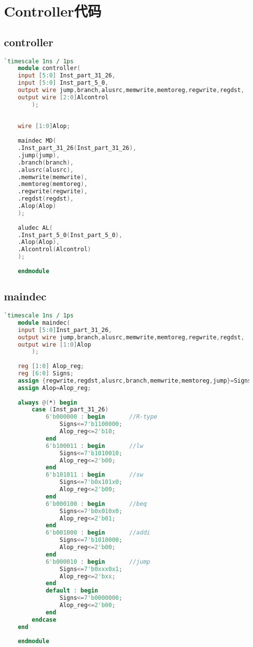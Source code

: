 \appendix
\section{Controller代码}
\subsection{controller}
\begin{lstlisting}[language=Verilog]
    `timescale 1ns / 1ps
    module controller(
    input [5:0] Inst_part_31_26,
    input [5:0] Inst_part_5_0,
    output wire jump,branch,alusrc,memwrite,memtoreg,regwrite,regdst,
    output wire [2:0]Alcontrol
        );
    
    
    wire [1:0]Alop;
    
    maindec MD(
    .Inst_part_31_26(Inst_part_31_26),
    .jump(jump),
    .branch(branch),
    .alusrc(alusrc),
    .memwrite(memwrite),
    .memtoreg(memtoreg),
    .regwrite(regwrite),
    .regdst(regdst),
    .Alop(Alop)
    );
    
    aludec AL(
    .Inst_part_5_0(Inst_part_5_0),
    .Alop(Alop),
    .Alcontrol(Alcontrol)
    );
    
    endmodule
\end{lstlisting}
\subsection{maindec}
\begin{lstlisting}[language=Verilog]
    `timescale 1ns / 1ps
    module maindec(
    input [5:0]Inst_part_31_26,
    output wire jump,branch,alusrc,memwrite,memtoreg,regwrite,regdst,
    output wire [1:0]Alop
        );
    
    reg [1:0] Alop_reg;
    reg [6:0] Signs;
    assign {regwrite,regdst,alusrc,branch,memwrite,memtoreg,jump}=Signs;
    assign Alop=Alop_reg;
    
    always @(*) begin
        case (Inst_part_31_26)
            6'b000000 : begin       //R-type
                Signs<=7'b1100000;
                Alop_reg<=2'b10;
            end
            6'b100011 : begin       //lw
                Signs<=7'b1010010;
                Alop_reg<=2'b00;
            end
            6'b101011 : begin       //sw
                Signs<=7'b0x101x0;
                Alop_reg<=2'b00;
            end
            6'b000100 : begin       //beq
                Signs<=7'b0x010x0;
                Alop_reg<=2'b01;
            end
            6'b001000 : begin       //addi
                Signs<=7'b1010000;
                Alop_reg<=2'b00;
            end
            6'b000010 : begin       //jump
                Signs<=7'b0xxx0x1;
                Alop_reg<=2'bxx;
            end
            default : begin
                Signs<=7'b0000000;
                Alop_reg<=2'b00;
            end
        endcase
    end
    
    endmodule
    
\end{lstlisting}

